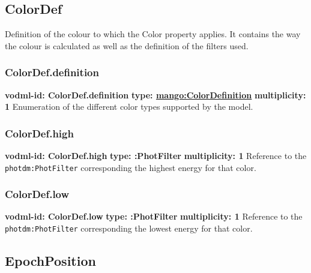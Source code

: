   \subsection{ColorDef}
  \label{sect:ColorDef}
    Definition of the colour to which the Color property applies. It contains the way the colour is calculated as well as the definition of the filters used.

    \subsubsection{ColorDef.definition}
      \textbf{vodml-id: ColorDef.definition} \newline
      \textbf{type: \hyperref[sect:ColorDefinition]{mango:ColorDefinition}} \newline
      \textbf{multiplicity: 1} \newline 
      Enumeration of the different color types supported by the model.

    \subsubsection{ColorDef.high}
      \textbf{vodml-id: ColorDef.high} \newline
      \textbf{type: :PhotFilter} \newline
      \textbf{multiplicity: 1} \newline 
      Reference to the \texttt{photdm:PhotFilter} corresponding the highest energy for that color.

    \subsubsection{ColorDef.low}
      \textbf{vodml-id: ColorDef.low} \newline
      \textbf{type: :PhotFilter} \newline
      \textbf{multiplicity: 1} \newline 
      Reference to the \texttt{photdm:PhotFilter} corresponding the lowest energy for that color.

  \subsection{EpochPosition}

